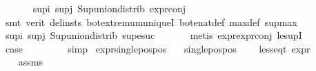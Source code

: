 \begin{isabellebody}
\ \ \ \ \ \isamarkupfalse%
\ sup{\isacharunderscore}{\kern0pt}i\ sup{\isacharunderscore}{\kern0pt}j\ Sup{\isacharunderscore}{\kern0pt}union{\isacharunderscore}{\kern0pt}distrib\ expr{\isacharunderscore}{\kern0pt}{}{\isacharunderscore}{\kern0pt}conj\isanewline
\ \ \ \ \ \ \isamarkupfalse%
\ {\isacharparenleft}{\kern0pt}smt\ {\isacharparenleft}{\kern0pt}verit{\isacharcomma}{\kern0pt}\ del{\isacharunderscore}{\kern0pt}insts{\isacharparenright}{\kern0pt}\ bot{\isachardot}{\kern0pt}extremum{\isacharunderscore}{\kern0pt}uniqueI\ bot{\isacharunderscore}{\kern0pt}enat{\isacharunderscore}{\kern0pt}def\ max{\isacharunderscore}{\kern0pt}def\ sup{\isacharunderscore}{\kern0pt}max{\isacharparenright}{\kern0pt}\isanewline
\ \ \ \ \ \isamarkupfalse%
\ sup{\isacharunderscore}{\kern0pt}i\ sup{\isacharunderscore}{\kern0pt}j\ Sup{\isacharunderscore}{\kern0pt}union{\isacharunderscore}{\kern0pt}distrib\ sup{\isacharunderscore}{\kern0pt}esuc\isanewline
\ \ \ \ \ \isamarkupfalse%
\ {\isacharparenleft}{\kern0pt}metis\ expr{\isacharunderscore}{\kern0pt}{}{\isachardot}{\kern0pt}expr{\isacharunderscore}{\kern0pt}{}{\isacharunderscore}{\kern0pt}conj\ le{\isacharunderscore}{\kern0pt}supI{\isacharparenright}{\kern0pt}\isanewline
\ \ \ \ \isamarkupfalse%
\ \isamarkupfalse%
\ {\isacharquery}{\kern0pt}case\ \isanewline
\ \ \ \ \ \ \isamarkupfalse%
\ simp\isanewline
{}\isamarkupfalse%
%
\endisatagproof
{\isafoldproof}%
%
\isadelimproof
\isanewline
%
\endisadelimproof
\isanewline
{}\isamarkupfalse%
\ expr{\isacharunderscore}{\kern0pt}single{\isacharunderscore}{\kern0pt}pos{\isacharunderscore}{\kern0pt}pos{\isacharcolon}{\kern0pt}\isanewline
\ \ \ {\isachardoublequoteopen}single{\isacharunderscore}{\kern0pt}pos{\isacharunderscore}{\kern0pt}pos\ {\isasymphi}{\isachardoublequoteclose}\isanewline
\ \ \ {\isachardoublequoteopen}less{\isacharunderscore}{\kern0pt}eq{\isacharunderscore}{\kern0pt}t\ {\isacharparenleft}{\kern0pt}expr\ {\isasymphi}{\isacharparenright}{\kern0pt}\ {\isacharparenleft}{\kern0pt}{}{\isacharcomma}{\kern0pt}\ {\isasyminfinity}{\isacharcomma}{\kern0pt}\ {}{\isacharcomma}{\kern0pt}\ {}{\isacharcomma}{\kern0pt}\ {}{\isacharcomma}{\kern0pt}\ {}{\isacharparenright}{\kern0pt}{\isachardoublequoteclose}\isanewline
%
\isadelimproof
\ \ %
\endisadelimproof
%
\isatagproof
{}\isamarkupfalse%
\ assms\isanewline

\end{isabellebody}
